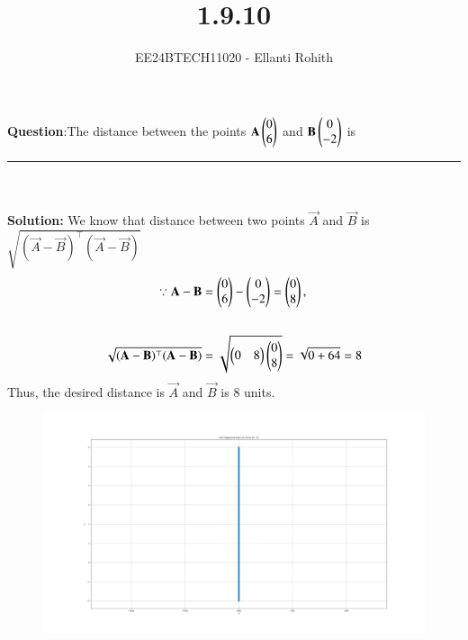 \documentclass[journal]{IEEEtran}
\begin{document}

\vspace{3cm}

\title{1.9.10}
\author{EE24BTECH11020 - Ellanti Rohith}
{\let\newpage\relax\maketitle}

\renewcommand{\thefigure}{\theenumi}
\renewcommand{\thetable}{\theenumi}
\setlength{\intextsep}{10pt} %


\renewcommand{\thetable}{\theenumi}


\textbf{Question}:The distance between the points $\mathbf{A} \begin{pmatrix}0\\6\end{pmatrix}$ and $\mathbf{B} \begin{pmatrix}0\\-2\end{pmatrix}$ is \rule{1cm}{0.15mm} \vspace{.5em} \\  \\ \textbf{Solution:} We know that distance between two points $\vec{A}$ and $\vec{B}$ is $\sqrt{(\vec{A}-\vec{B})^\top (\vec{A}-\vec{B})}$ \\[1.5em]
	\begin{align}
\because
		\mathbf{A} - \mathbf{B} &= \begin{pmatrix}0\\6\end{pmatrix} - \begin{pmatrix}0\\-2\end{pmatrix} = \begin{pmatrix}0\\8\end{pmatrix},		
\\[1.8em]
\sqrt{(\mathbf{A}-\mathbf{B})^\top (\mathbf{A}-\mathbf{B})} &= \sqrt{\begin{pmatrix}0 & 8\end{pmatrix} \begin{pmatrix}0\\8\end{pmatrix}} = \sqrt{0 + 64} = 8
	\end{align} 
	Thus, the desired distance is $\vec{A}$ and $\vec{B}$ is 8 units.
	\\\begin{figure}[h!]
   \centering \includegraphics[width=0.7\linewidth]{figs/fig.png}
   \label{Plot of Vector AB}
   \end{figure}
	
\end{document}
